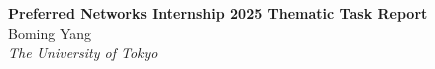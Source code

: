 \documentclass[a4paper,12pt]{article}
\begin{document}
\pagestyle{fancy}
\thispagestyle{empty}
\fancyhead[L]{}
\renewcommand*{\thefootnote}{\fnsymbol{footnote}}
\begin{center}
\Large{\textbf{Preferred Networks Internship 2025 Thematic Task Report}}
\vspace{0.4cm}
\normalsize
\\ Boming Yang \\
\vspace{0.1cm}
\textit{The University of Tokyo} \\
\medskip
\normalsize
\end{center}






\end{document}
